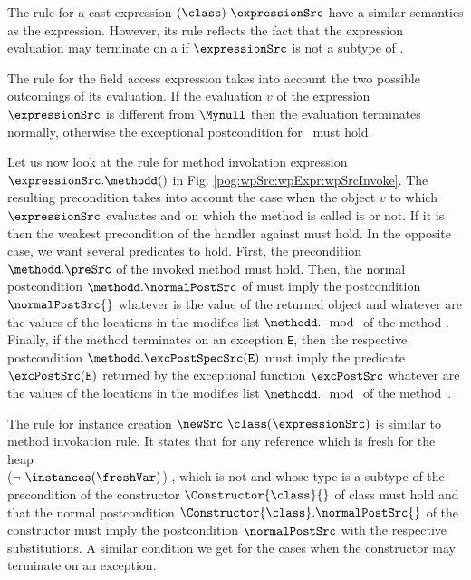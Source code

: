 The rule for a cast expression $( \class ) \ \expressionSrc$ 
  have a similar semantics as the \instanceofSrc{} expression.
 However, its rule reflects the fact that the expression evaluation may terminate on 
a \ClassCastExc{} if $ \expressionSrc$ is not a subtype of  \class.

 The rule for the field access expression takes into account
the two possible  outcomings of its evaluation. If the evaluation $v$ of the expression $\expressionSrc$ 
is different from $\Mynull$ then the evaluation terminates normally, otherwise the exceptional postcondition  
for \NullPointerExc \ must hold.

  
Let us now look at the rule for method invokation expression $ \expressionSrc.\methodd()$ in Fig. \ref{pog:wpSrc:wpExpr:wpSrcInvoke}.
The resulting precondition  takes into account the case when the  object $v$ to which $\expressionSrc $ evaluates and
 on which  the method is called is \Mynull{} or not. If it is \Mynull{} then the weakest precondition of the handler against \NullPointerExc{}
must hold. In the opposite case, we want several predicates to hold. 
First, the precondition $ \methodd.\preSrc $  of the invoked method \methodd{} must hold. 
Then, the  normal postcondition $\methodd.\normalPostSrc $ 
of \methodd{} must imply the postcondition  $\normalPostSrc{}$ whatever is the value of the returned object and whatever are the values of the 
locations in the modifies list $\methodd. \mod{}$  of the method \methodd. Finally, if the method \methodd{} terminates on an exception \mbox{\rm\texttt{E}},
 then the respective postcondition    $\methodd.\excPostSpecSrc(\mbox{\rm \texttt{E}})$ must imply the predicate $\excPostSrc(\mbox{\rm\texttt{E}} )$  returned by the exceptional function 
 $\excPostSrc$ whatever are the values of the locations in the modifies list  $\methodd. \mod{} $  of the method~\methodd.

The rule for instance creation  $\newSrc \ \class  ( \expressionSrc  )$ 
is similar to method invokation rule. It states that  for any reference which is
 fresh for the heap \\ 
($\neg \ \instances(\freshVar ) $) ,  which is not \Mynull{} and whose type is a subtype of \class{}  
the precondition of the constructor  $\Constructor{\class}{}$  of class  \class{} must hold and that the 
normal postcondition $\Constructor{\class}.\normalPostSrc{}$ of the constructor 
must imply the postcondition  $\normalPostSrc$ with the respective substitutions. A similar condition we
 get for the cases when the constructor may terminate on an exception.



